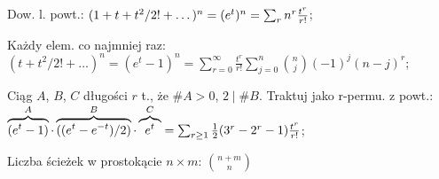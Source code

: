 \entry
Dow. l. powt.: ${(1+t+t^2/2! + \dots)^n} = {(e^{t})^n} =
  {\sum_rn^r{t^r \over r!}}$;

\entry
Każdy elem. co najmniej raz: $(t + t^2/2! + \dots)^n = (e^t - 1)^n =
  \sum^\infty_{r=0}\frac{t^r}{r!}\sum^n_{j=0}\binom{n}{j}(-1)^j(n-j)^r$;

\entry
Ciąg $A$, $B$, $C$ długości $r$ t., że $\#A>0$, $2\mid\#B$. Traktuj jako r-permu.
  z powt.:
  $\overbrace{(e^t - 1)}^A\cdot\overbrace{((e^t - e^{-t})/2)}^B
  \cdot\overbrace{e^t}^C =
  \sum_{r \geq 1} {1 \over 2}(3^r - 2^r - 1){t^r \over r!}$;

  \entry 
Liczba ścieżek w prostokącie $n \times m$: $\binom{n+m}{n}$
